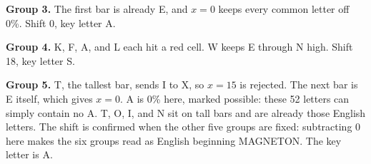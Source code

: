 \documentclass[12pt]{article}
\begin{document}
\begin{answer}
    \textbf{Group 3.} The first bar is already E, and \(x=0\) keeps every common letter off 0\%. Shift 0, key letter A.

    \begin{center}
    \end{center}

    \textbf{Group 4.} K, F, A, and L each hit a red cell. W keeps E through N high. Shift 18, key letter S.

    \begin{center}
    \end{center}

    \textbf{Group 5.} T, the tallest bar, sends I to X, so \(x=15\) is rejected. The next bar is E itself, which gives \(x=0\). A is 0\% here, marked possible: these 52 letters can simply contain no A. T, O, I, and N sit on tall bars and are already those English letters. The shift is confirmed when the other five groups are fixed: subtracting 0 here makes the six groups read as English beginning MAGNETON. The key letter is A.

    \begin{center}
    \end{center}


\end{answer}
\end{document}
